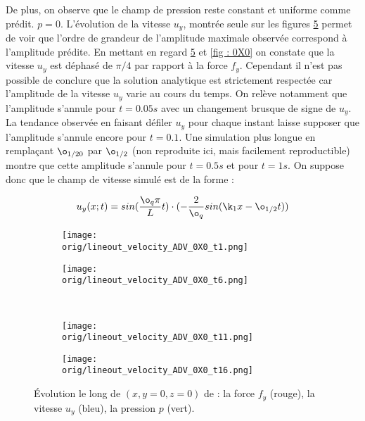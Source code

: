 De plus, on observe que le champ de pression reste constant et uniforme comme prédit. $p = 0$. L’évolution de la vitesse $u_y$, montrée seule sur les figures \ref{fig : v_0X0} permet de voir que l'ordre de grandeur de l'amplitude maximale observée correspond à l'amplitude prédite. En mettant en regard \ref{fig : v_0X0} et \ref{fig : 0X0} on constate que la vitesse $u_y$ est déphasé de $\pi/4$ par rapport à la force $f_y$. Cependant il n'est pas possible de conclure que la solution analytique est strictement respectée car l'amplitude de la vitesse $u_y$ varie au cours du temps. On relève notamment que l'amplitude s'annule pour $t=0.05s$ avec un changement brusque de signe de $u_y$. La tendance observée en faisant défiler $u_y$ pour chaque instant laisse supposer que l'amplitude s'annule encore pour $t=0.1$. Une simulation plus longue en remplaçant $\o_{1/20}$ par $\o_{1/2}$ (non reproduite ici, mais facilement reproductible) montre que cette amplitude s'annule pour $t=0.5s$ et pour $t=1s$. On suppose donc que le champ de vitesse simulé est de la forme :

\begin{align}
u_y(x;t) = sin(\frac{\o_q \pi}{L} t ) \cdot ( - \frac{2}{\o_{q}} sin(\k_1 x - \o_{1/2} t))
\end{align}


\begin{figure}
\begin{center}
	\begin{subfigure}[t]{0.4\textwidth}                                                                                                                                   
		\texttt{[image: \\orig/lineout\_velocity\_ADV\_0X0\_t1.png]}
		\label{fig : v_0X0_t1}
	\end{subfigure}\hfill
	\begin{subfigure}[t]{0.4\textwidth}
		\texttt{[image: \\orig/lineout\_velocity\_ADV\_0X0\_t6.png]}
		\label{fig : v_0X0_t6}
	\end{subfigure}
\\
	\begin{subfigure}[t]{0.4\textwidth}
		\texttt{[image: \\orig/lineout\_velocity\_ADV\_0X0\_t11.png]}
		\label{fig : v_0X0_t11}
	\end{subfigure}\hfill
	\begin{subfigure}[t]{0.4\textwidth}
		\texttt{[image: \\orig/lineout\_velocity\_ADV\_0X0\_t16.png]}
		\label{fig : v_0X0_t16}
	\end{subfigure}
\end{center}
\caption{Évolution le long de $(x,y=0,z=0)$ de : la force $f_y$ (rouge), la vitesse $u_y$ (bleu), la pression $p$ (vert).}
\label{fig : v_0X0}
\end{figure}



